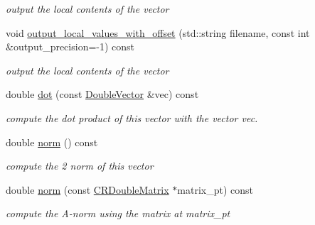 \begin{DoxyCompactItemize}
\begin{DoxyCompactList}\small\item\em output the local contents of the vector \end{DoxyCompactList}\item 
void \hyperlink{classoomph_1_1DoubleVector_aa9f03b47d00fe70e4f5e4f2474b48bf4}{output\+\_\+local\+\_\+values\+\_\+with\+\_\+offset} (std\+::string filename, const int \&output\+\_\+precision=-\/1) const
\begin{DoxyCompactList}\small\item\em output the local contents of the vector \end{DoxyCompactList}\item 
double \hyperlink{classoomph_1_1DoubleVector_abd20e2e394c8e08749ed34c7228c8506}{dot} (const \hyperlink{classoomph_1_1DoubleVector}{Double\+Vector} \&vec) const
\begin{DoxyCompactList}\small\item\em compute the dot product of this vector with the vector vec. \end{DoxyCompactList}\item 
double \hyperlink{classoomph_1_1DoubleVector_a9ac9245cac87ddcdb70cfcd697553a55}{norm} () const
\begin{DoxyCompactList}\small\item\em compute the 2 norm of this vector \end{DoxyCompactList}\item 
double \hyperlink{classoomph_1_1DoubleVector_abe25ba0bd83ba1e963103c4ad95328cc}{norm} (const \hyperlink{classoomph_1_1CRDoubleMatrix}{C\+R\+Double\+Matrix} $\ast$matrix\+\_\+pt) const
\begin{DoxyCompactList}\small\item\em compute the A-\/norm using the matrix at matrix\+\_\+pt \end{DoxyCompactList}\end{DoxyCompactItemize}
